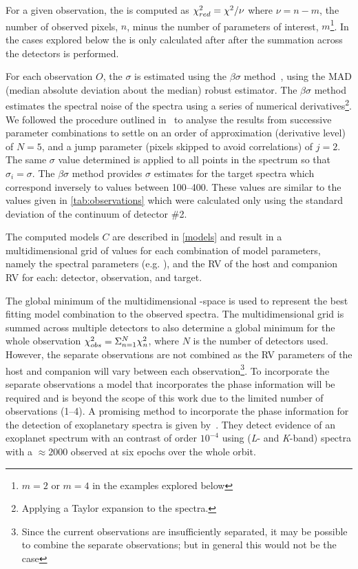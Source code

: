 For a given observation, the \textchisquaredreduced{} is computed as \({\chi}^{2}_{red}{} = {\chi}^{2}{} / \nu\) where \(\nu = n - m\), the number of observed pixels, \(n\), minus the number of parameters of interest, \(m\)\footnote{\(m=2\) or \(m=4\) in the examples explored below}.
In the cases explored below the \textchisquaredreduced{} is only calculated after after the summation across the detectors is performed.

For each observation $O$, the \(\sigma\) is estimated using the \(\beta\sigma\) method~\citep{czesla_posteriori_2018}, using the {MAD} (median absolute deviation about the median) robust estimator.
The \(\beta\sigma\) method estimates the spectral noise of the spectra using a series of numerical derivatives\footnote{Applying a Taylor expansion to the spectra.}.
We followed the procedure outlined in~\citet{czesla_posteriori_2018} to analyse the results from successive parameter combinations to settle on an order of approximation (derivative level) of \(N=5\), and a jump parameter (pixels skipped to avoid correlations) of \(j=2\).
The same \(\sigma\) value determined is applied to all points in the spectrum so that \({\sigma}_{i} = \sigma\).
The \(\beta\sigma\) method provides \(\sigma\) estimates for the target spectra which correspond inversely to \snr{} values between 100--400.
These \snr{} values are similar to the values given in \cref{tab:observations} which were calculated only using the standard deviation of the continuum of detector \#2.

The computed models $C$ are described in \cref{models} and result in a multidimensional grid of \textchisquared{} values for each combination of model parameters, namely the spectral parameters  (e.g. \Teff{}), and the {RV} of the host and companion {RV} for each: detector, observation, and target.

The global minimum of the multidimensional \textchisquared-space is used to represent the best fitting model combination to the observed spectra.
The multidimensional \textchisquared{} grid is summed across multiple detectors to also determine a global minimum \textchisquared{} for the whole observation \({\chi}^{2}_{obs} = \Sigma^{N}_{n=1} {\chi}^{2}_n\), where \(N\) is the number of detectors used.
However, the separate observations are not combined as the {RV} parameters of the host and companion will vary between each observation\footnote{Since the current observations are insufficiently separated, it may be possible to combine the separate observations; but in general this would not be the case}.
To incorporate the separate observations a model that incorporates the phase information will be required and is beyond the scope of this work due to the limited number of observations (1--4).
A promising method to incorporate the phase information for the detection of exoplanetary spectra is given by~\citet{lockwood_nearir_2014,piskorz_evidence_2016}.
They detect evidence of an exoplanet spectrum with an contrast of order \({10}^{-4}\) using \nir{} (\textit{L}- and \textit{K}-band) spectra with a \snr{}\(\approx2000\) observed at six epochs over the whole orbit.



